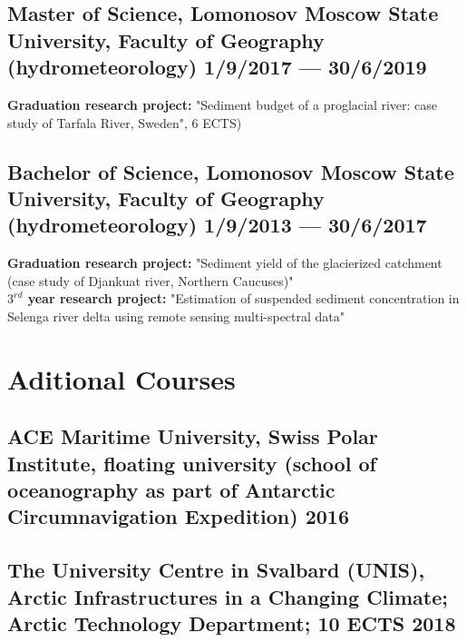 \documentclass[a4,10pt]{article}
\begin{document}
\subsection*{Master of Science, {\normalsize \normalfont Lomonosov Moscow State University, Faculty of Geography (hydrometeorology)} \hfill 1/9/2017 --- 30/6/2019} 
\textbf{Graduation research project:} "Sediment budget of a proglacial river: case study of Tarfala River, Sweden", 6 ECTS)
\vspace{0.1cm}

\subsection*{Bachelor of Science, {\normalsize \normalfont Lomonosov Moscow State University, Faculty of Geography (hydrometeorology)} \hfill 1/9/2013 --- 30/6/2017} 
\textbf{Graduation research project:} "Sediment yield of the glacierized catchment (case study of Djankuat river, Northern Caucuses)"\\
\textbf{$3^{rd}$ year research project:} "Estimation of suspended sediment concentration in Selenga river delta using remote sensing multi-spectral data" 
\vspace{0.2cm}

\section{Aditional Courses }
\subsection*{ACE Maritime University, {\normalsize \normalfont Swiss Polar Institute, floating university (school of oceanography as part of Antarctic Circumnavigation Expedition)} \hfill 2016} 
\vspace{0.1cm}
\subsection*{The University Centre in Svalbard (UNIS), {\normalsize \normalfont Arctic Infrastructures in a Changing Climate; Arctic Technology Department; 10 ECTS} \hfill 2018} 
\vspace{0.2cm}
\end{document}

